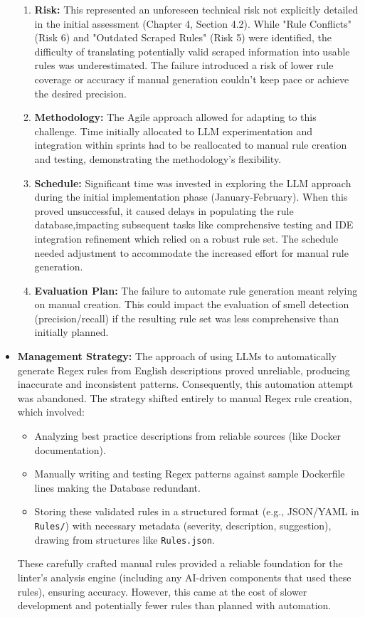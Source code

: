 \begin{itemize}
\begin{enumerate}
            \item \textbf{Risk:} This represented an unforeseen technical risk not explicitly detailed in the initial assessment (Chapter 4, Section 4.2). While "Rule Conflicts" (Risk 6) and "Outdated Scraped Rules" (Risk 5) were identified, the difficulty of translating potentially valid scraped information into usable rules was underestimated. The failure introduced a risk of lower rule coverage or accuracy if manual generation couldn't keep pace or achieve the desired precision.
            \item \textbf{Methodology:} The Agile approach allowed for adapting to this challenge. Time initially allocated to LLM experimentation and integration within sprints had to be reallocated to manual rule creation and testing, demonstrating the methodology's flexibility.
            \item \textbf{Schedule:} Significant time was invested in exploring the LLM approach during the initial implementation phase (January-February). When this proved unsuccessful, it caused delays in populating the rule database,impacting subsequent tasks like comprehensive testing and IDE integration refinement which relied on a robust rule set. The schedule needed adjustment to accommodate the increased effort for manual rule generation.
            \item \textbf{Evaluation Plan:} The failure to automate rule generation meant relying on manual creation. This could impact the evaluation of smell detection (precision/recall) if the resulting rule set was less comprehensive than initially planned.
        \end{enumerate}
\item \textbf{Management Strategy:} The approach of using LLMs to automatically generate Regex rules from English descriptions proved unreliable, producing inaccurate and inconsistent patterns. Consequently, this automation attempt was abandoned. The strategy shifted entirely to manual Regex rule creation, which involved:
    \begin{itemize}
        \item Analyzing best practice descriptions from reliable sources (like Docker documentation).
        \item Manually writing and testing Regex patterns against sample Dockerfile lines making the Database redundant. 
        \item Storing these validated rules in a structured format (e.g., JSON/YAML in \texttt{Rules/}) with necessary metadata (severity, description, suggestion), drawing from structures like \texttt{Rules.json}.
    \end{itemize}
    These carefully crafted manual rules provided a reliable foundation for the linter's analysis engine (including any AI-driven components that used these rules), ensuring accuracy. However, this came at the cost of slower development and potentially fewer rules than planned with automation.
\end{itemize}

